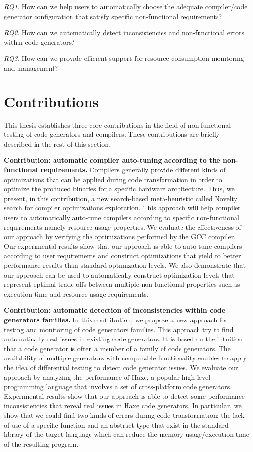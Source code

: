 \textit{RQ1.} How can we help users to automatically choose the adequate compiler/code generator configuration that satisfy specific non-functional requirements?

\textit{RQ2.} How can we automatically detect inconsistencies and non-functional errors within code generators?

\textit{RQ3.} How can we provide efficient support for resource consumption monitoring and management?


\section{Contributions}
This thesis establishes three core contributions in the field of non-functional testing of code generators and compilers. 
These contributions are briefly described in the rest of this section.

\textbf{Contribution: automatic compiler auto-tuning according to the non-functional requirements.}
Compilers generally provide different kinds of optimizations that can be applied during code transformation in order to optimize the produced binaries for a specific hardware architecture. Thus, we present, in this contribution, a new search-based meta-heuristic called Novelty search for compiler optimizations exploration. This approach will help compiler users to automatically auto-tune compilers according to specific non-functional requirements namely resource usage properties. 
We evaluate the effectiveness of our approach by verifying the optimizations performed by the GCC compiler.
Our experimental results show that our approach is able to auto-tune compilers according to user requirements and construct optimizations that yield to better performance results than standard optimization levels. We also demonstrate that our approach can be used to automatically construct optimization levels that represent optimal trade-offs between multiple non-functional properties such as execution time and resource usage requirements.

\textbf{Contribution: automatic detection of inconsistencies within code generators families.}
In this contribution, we propose a new approach for testing and monitoring of code generators families. This approach try to find automatically real issues in existing code generators. 
It is based on the intuition that a code generator is often a member of a family of code generators. The availability of multiple generators with comparable functionality enables to apply the idea of differential testing\cite{mckeeman1998differential} to detect code generator issues.
We evaluate our approach by analyzing the performance of Haxe, a popular high-level programming language that involves a set of cross-platform code generators. Experimental results show that our approach is able to detect some performance inconsistencies that reveal real issues in Haxe code generators.
In particular, we show that we could find two kinds of errors during code transformation: the lack of use of a specific function and an abstract type that exist in the standard library of the target language which can reduce the memory usage/execution time of the resulting program.

